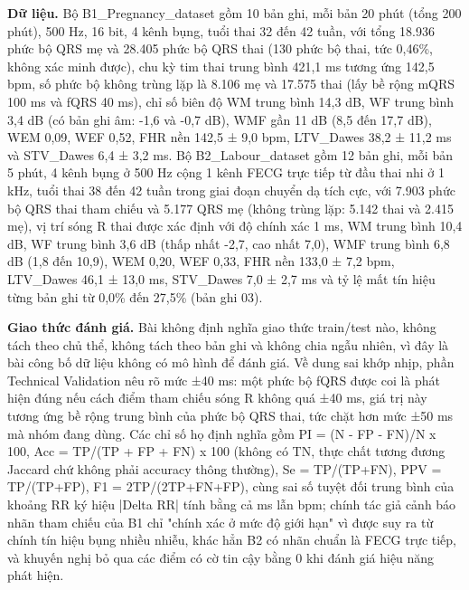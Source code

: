 \documentclass[12pt,a4paper]{article}
\begin{document}
\noindent \textbf{Dữ liệu.} Bộ B1\_Pregnancy\_dataset gồm 10 bản ghi, mỗi bản 20 phút (tổng 200 phút), 500 Hz, 16 bit, 4 kênh bụng, tuổi thai 32 đến 42 tuần, với tổng 18.936 phức bộ QRS mẹ và 28.405 phức bộ QRS thai (130 phức bộ thai, tức 0,46\%, không xác minh được), chu kỳ tim thai trung bình 421,1 ms tương ứng 142,5 bpm, số phức bộ không trùng lặp là 8.106 mẹ và 17.575 thai (lấy bề rộng mQRS 100 ms và fQRS 40 ms), chỉ số biên độ WM trung bình 14,3 dB, WF trung bình 3,4 dB (có bản ghi âm: -1,6 và -0,7 dB), WMF gần 11 dB (8,5 đến 17,7 dB), WEM 0,09, WEF 0,52, FHR nền 142,5 ± 9,0 bpm, LTV\_Dawes 38,2 ± 11,2 ms và STV\_Dawes 6,4 ± 3,2 ms. Bộ B2\_Labour\_dataset gồm 12 bản ghi, mỗi bản 5 phút, 4 kênh bụng ở 500 Hz cộng 1 kênh FECG trực tiếp từ đầu thai nhi ở 1 kHz, tuổi thai 38 đến 42 tuần trong giai đoạn chuyển dạ tích cực, với 7.903 phức bộ QRS thai tham chiếu và 5.177 QRS mẹ (không trùng lặp: 5.142 thai và 2.415 mẹ), vị trí sóng R thai được xác định với độ chính xác 1 ms, WM trung bình 10,4 dB, WF trung bình 3,6 dB (thấp nhất -2,7, cao nhất 7,0), WMF trung bình 6,8 dB (1,8 đến 10,9), WEM 0,20, WEF 0,33, FHR nền 133,0 ± 7,2 bpm, LTV\_Dawes 46,1 ± 13,0 ms, STV\_Dawes 7,0 ± 2,7 ms và tỷ lệ mất tín hiệu từng bản ghi từ 0,0\% đến 27,5\% (bản ghi 03).\par\vspace{3pt}
\noindent \textbf{Giao thức đánh giá.} Bài không định nghĩa giao thức train/test nào, không tách theo chủ thể, không tách theo bản ghi và không chia ngẫu nhiên, vì đây là bài công bố dữ liệu không có mô hình để đánh giá. Về dung sai khớp nhịp, phần Technical Validation nêu rõ mức ±40 ms: một phức bộ fQRS được coi là phát hiện đúng nếu cách điểm tham chiếu sóng R không quá ±40 ms, giá trị này tương ứng bề rộng trung bình của phức bộ QRS thai, tức chặt hơn mức ±50 ms mà nhóm đang dùng. Các chỉ số họ định nghĩa gồm PI = (N - FP - FN)/N x 100, Acc = TP/(TP + FP + FN) x 100 (không có TN, thực chất tương đương Jaccard chứ không phải accuracy thông thường), Se = TP/(TP+FN), PPV = TP/(TP+FP), F1 = 2TP/(2TP+FN+FP), cùng sai số tuyệt đối trung bình của khoảng RR ký hiệu |Delta RR| tính bằng cả ms lẫn bpm; chính tác giả cảnh báo nhãn tham chiếu của B1 chỉ "chính xác ở mức độ giới hạn" vì được suy ra từ chính tín hiệu bụng nhiều nhiễu, khác hẳn B2 có nhãn chuẩn là FECG trực tiếp, và khuyến nghị bỏ qua các điểm có cờ tin cậy bằng 0 khi đánh giá hiệu năng phát hiện.\par\vspace{3pt}
\end{document}
